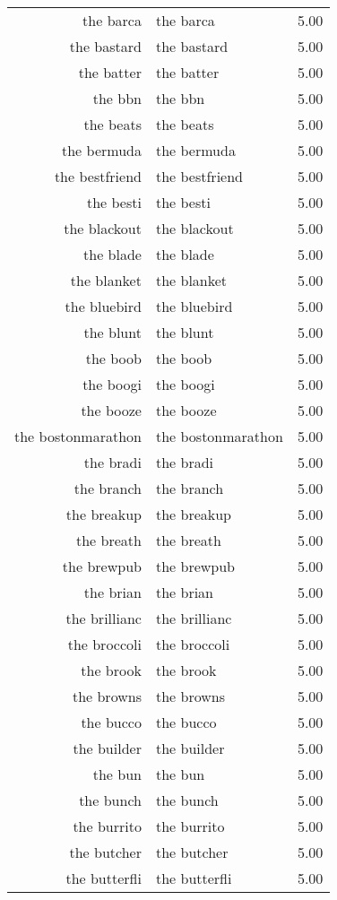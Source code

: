 \begin{table}[ht]
\begin{tabular}{rlr}
  the barca & the barca & 5.00 \\ 
  the bastard & the bastard & 5.00 \\ 
  the batter & the batter & 5.00 \\ 
  the bbn & the bbn & 5.00 \\ 
  the beats & the beats & 5.00 \\ 
  the bermuda & the bermuda & 5.00 \\ 
  the bestfriend & the bestfriend & 5.00 \\ 
  the besti & the besti & 5.00 \\ 
  the blackout & the blackout & 5.00 \\ 
  the blade & the blade & 5.00 \\ 
  the blanket & the blanket & 5.00 \\ 
  the bluebird & the bluebird & 5.00 \\ 
  the blunt & the blunt & 5.00 \\ 
  the boob & the boob & 5.00 \\ 
  the boogi & the boogi & 5.00 \\ 
  the booze & the booze & 5.00 \\ 
  the bostonmarathon & the bostonmarathon & 5.00 \\ 
  the bradi & the bradi & 5.00 \\ 
  the branch & the branch & 5.00 \\ 
  the breakup & the breakup & 5.00 \\ 
  the breath & the breath & 5.00 \\ 
  the brewpub & the brewpub & 5.00 \\ 
  the brian & the brian & 5.00 \\ 
  the brillianc & the brillianc & 5.00 \\ 
  the broccoli & the broccoli & 5.00 \\ 
  the brook & the brook & 5.00 \\ 
  the browns & the browns & 5.00 \\ 
  the bucco & the bucco & 5.00 \\ 
  the builder & the builder & 5.00 \\ 
  the bun & the bun & 5.00 \\ 
  the bunch & the bunch & 5.00 \\ 
  the burrito & the burrito & 5.00 \\ 
  the butcher & the butcher & 5.00 \\ 
  the butterfli & the butterfli & 5.00 \\ 

\end{tabular}
\end{table}
